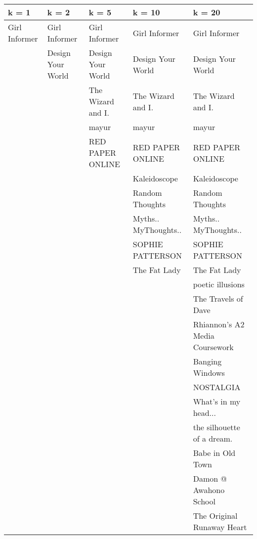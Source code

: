 \begin{tabular}{lllll}
\hline
 k = 1         & k = 2             & k = 5             & k = 10               & k = 20                         \\
\hline
 Girl Informer & Girl Informer     & Girl Informer     & Girl Informer        & Girl Informer                  \\
               & Design Your World & Design Your World & Design Your World    & Design Your World              \\
               &                   & The Wizard and I. & The Wizard and I.    & The Wizard and I.              \\
               &                   & mayur             & mayur                & mayur                          \\
               &                   & RED PAPER ONLINE  & RED PAPER ONLINE     & RED PAPER ONLINE               \\
               &                   &                   & Kaleidoscope         & Kaleidoscope                   \\
               &                   &                   & Random Thoughts      & Random Thoughts                \\
               &                   &                   & Myths.. MyThoughts.. & Myths.. MyThoughts..           \\
               &                   &                   & SOPHIE PATTERSON     & SOPHIE PATTERSON               \\
               &                   &                   & The Fat Lady         & The Fat Lady                   \\
               &                   &                   &                      & poetic illusions               \\
               &                   &                   &                      & The Travels of Dave            \\
               &                   &                   &                      & Rhiannon's A2 Media Coursework \\
               &                   &                   &                      & Banging Windows                \\
               &                   &                   &                      & NOSTALGIA                      \\
               &                   &                   &                      & What's in my head...           \\
               &                   &                   &                      & the silhouette of a dream.     \\
               &                   &                   &                      & Babe in Old Town               \\
               &                   &                   &                      & Damon @ Awahono School         \\
               &                   &                   &                      & The Original Runaway Heart     \\
\hline
\end{tabular}